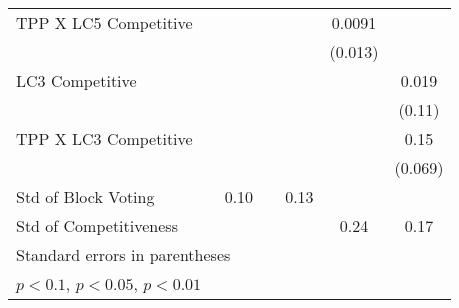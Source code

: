 {\begin{tabular}{l*{6}{c}}
TPP X LC5 Competitive&                  &                  &                  &                  &   0.0091         &                  \\
                &                  &                  &                  &                  &  (0.013)         &                  \\
LC3 Competitive &                  &                  &                  &                  &                  &    0.019         \\
                &                  &                  &                  &                  &                  &   (0.11)         \\
TPP X LC3 Competitive&                  &                  &                  &                  &                  &     0.15\sym{**} \\
                &                  &                  &                  &                  &                  &  (0.069)         \\
\midrule
Std of Block Voting&                  &     0.10         &                  &     0.13         &                  &                  \\
Std of Competitiveness&                  &                  &                  &                  &     0.24         &     0.17         \\
\bottomrule
\multicolumn{7}{l}{\footnotesize Standard errors in parentheses}\\
\multicolumn{7}{l}{\footnotesize \sym{*} \(p<0.1\), \sym{**} \(p<0.05\), \sym{***} \(p<0.01\)}\\
\end{tabular}
}
